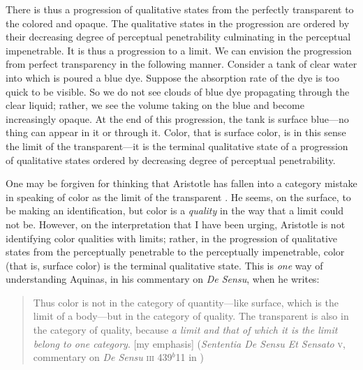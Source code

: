 There is thus a progression of qualitative states from the perfectly transparent to the colored and opaque. The qualitative states in the progression are ordered by their decreasing degree of perceptual penetrability culminating in the perceptual impenetrable. It is thus a progression to a limit. We can envision the progression from perfect transparency in the following manner. Consider a tank of clear water into which is poured a blue dye. Suppose the absorption rate of the dye is too quick to be visible. So we do not see clouds of blue dye propagating through the clear liquid; rather, we see the volume taking on the blue and become increasingly opaque. At the end of this progression, the tank is surface blue---no thing can appear in it or through it. Color, that is surface color, is in this sense the limit of the transparent---it is the terminal qualitative state of a progression of qualitative states ordered by decreasing degree of perceptual penetrability.

One may be forgiven for thinking that Aristotle has fallen into a category mistake in speaking of color as the limit of the transparent \citep[65]{Broackes:1999uq}. He seems, on the surface, to be making an identification, but color is a \emph{quality} in the way that a limit could not be. However, on the interpretation that I have been urging, Aristotle is not identifying color qualities with limits; rather, in the progression of qualitative states from the perceptually penetrable to the perceptually impenetrable, color (that is, surface color) is the terminal qualitative state. This is \emph{one} way of understanding Aquinas, in his commentary on \emph{De Sensu}, when he writes:
\begin{quote}
	Thus color is not in the category of quantity---like surface, which is the limit of a body---but in the category of quality. The transparent is also in the category of quality, because \emph{a limit and that of which it is the limit belong to one category}. [my emphasis] (\emph{Sententia De Sensu Et Sensato} \textsc{v}, commentary on \emph{De Sensu} \textsc{iii} 439\( ^{b} \)11 in \citealt{White:2005vn})
\end{quote}

